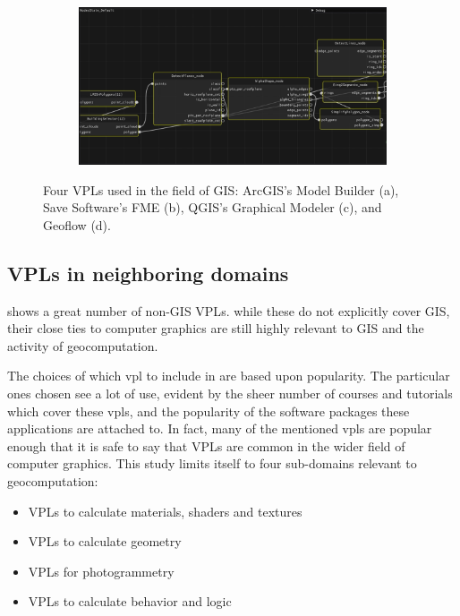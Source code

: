 \begin{figure}
\begin{subfigure}[c]{0.45\linewidth}
  \caption{}\label{fig:gisvpl:3}
\end{subfigure}%
\qquad 
\begin{subfigure}[d]{0.45\linewidth}
  \centering
  \graphicspath{{../../assets/images/background/geo-vpl/}}
  \includegraphics[width=\linewidth]{geoflow.png}
  \caption{}\label{fig:gisvpl:4}
\end{subfigure}%
\caption[GIS VPLs]{Four VPLs used in the field of GIS: 
ArcGIS's Model Builder \citep{esri_modelbuilder_2022} (a), 
Save Software's FME \citep{safe-software_fme_2022} (b), 
QGIS's Graphical Modeler \cite{qgis_community_qgis_2022} (c), 
and Geoflow \citep{peters_geoflow_2019} (d).}
\label{fig:gisvpl}
\end{figure}

\subsection*{ VPLs in neighboring domains }

 shows a great number of non-GIS \ac{VPL}s.
while these do not explicitly cover GIS, their close ties to computer graphics are still highly relevant to GIS and the activity of geocomputation.  

The choices of which vpl to include in  are based upon popularity.  
The particular ones chosen see a lot of use, evident by the sheer number of courses and tutorials which cover these vpls, and the popularity of the software packages these applications are attached to. 
In fact, many of the mentioned vpls are popular enough that it is safe to say that \ac{VPL}s are common in the wider field of computer graphics. 
This study limits itself to four sub-domains relevant to geocomputation:
\begin{itemize}[-]
  \item VPLs to calculate materials, shaders and textures
  \item VPLs to calculate geometry
  \item VPLs for photogrammetry 
  \item VPLs to calculate behavior and logic
\end{itemize}

